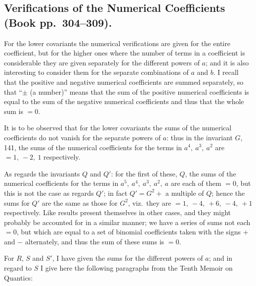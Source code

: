 \documentclass[11pt]{article}
\begin{document}
\bigskip

\subsection*{Verifications of the Numerical Coefficients (Book pp.~304--309).}

For the lower covariants the numerical verifications are given for the entire coefficient, but for the higher ones where the number of terms in a coefficient is considerable they are given separately for the different powers of $a$; and it is also interesting to consider them for the separate combinations of $a$ and $b$. I recall that the positive and negative numerical coefficients are summed separately, so that ``$\pm$ (a number)'' means that the sum of the positive numerical coefficients is equal to the sum of the negative numerical coefficients and thus that the whole sum is $=0$.

\medskip

It is to be observed that for the lower covariants the sums of the numerical coefficients do not vanish for the separate powers of $a$: thus in the invariant $G$, 141, the sums of the numerical coefficients for the terms in $a^4,\ a^3,\ a^2$ are $=1,\ -2,\ 1$ respectively.

\medskip

As regards the invariants $Q$ and $Q'$: for the first of these, $Q$, the sums of the numerical coefficients for the terms in $a^5,\ a^4,\ a^3,\ a^2,\ a$ are each of them $=0$, but this is not the case as regards $Q'$; in fact $Q' = G^2 + $ a multiple of $Q$; hence the sums for $Q'$ are the same as those for $G^2$, viz.\ they are $=1,\ -4,\ +6,\ -4,\ +1$ respectively. Like results present themselves in other cases, and they might probably be accounted for in a similar manner; we have a series of sums not each $=0$, but which are equal to a set of binomial coefficients taken with the signs $+$ and $-$ alternately, and thus the sum of these sums is $=0$.

\medskip

For $R$, $S$ and $S'$, I have given the sums for the different powers of $a$; and in regard to $S$ I give here the following paragraphs from the Tenth Memoir on Quantics:
\end{document}
